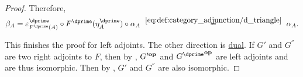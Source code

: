 \begin{proof}
  Therefore,
  \begin{equation*}
    \beta_A
    =
    \varepsilon^\dprime_{F^\dprime(A)} \bincirc F^\dprime(\eta^\dprime_A) \bincirc \alpha_A
    \reloset {\eqref{eq:def:category_adjunction/d_triangle}} =
    \alpha_A.
  \end{equation*}

  This finishes the proof for left adjoints. The other direction is \hyperref[thm:categorical_principle_of_duality]{dual}. If \( G' \) and \( G^\dprime \) are two right adjoints to \( F \), then by , \( G'^\oppos \) and \( {G^\dprime}^\oppos \) are left adjoints and are thus isomorphic. Then by , \( G' \) and \( G^\dprime \) are also isomorphic.
\end{proof}

